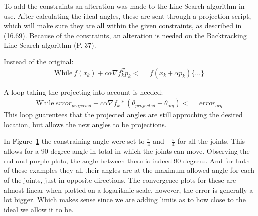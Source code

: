 \documentclass[11pt]{article} %
\begin{document}
To add the constraints an alteration was made to the Line Search algorithm in use. After calculating the ideal angles, these are sent through a projection script, which will make sure they are all within the given constraints, as described in (16.69).  Because of the constraints, an alteration is needed on the Backtracking Line Search algorithm (P. 37).

Instead of the original:
\begin{gather*}
\text{While} ~ f(x_k) + c \alpha \nabla f_k^T p_k <=f(x_k + \alpha p_k) \{ \dots \}
\end{gather*}

A loop taking the projecting into account is needed:
\begin{gather*}
\text{While} ~ error_{projected} + c \alpha \nabla f_k * (\theta_{projected} -\theta_{org}) <= error_{org}
\end{gather*}
This loop guarentees that the projected angles are still approching the desired location, but allows the new angles to be projections.

\begin{figure}[h!]
    \hfill
\caption{}
\label{fig:IK2}
\end{figure}
In Figure~\ref{fig:IK2} the constraining angle were set to $\frac{\pi}{4}$ and $-\frac{\pi}{4}$ for all the joints. This allows for a 90 degree angle in total in which the joints can move. Observing the red and purple plots, the angle between these is indeed 90 degrees. And for both of these examples they all their angles are at the maximum allowed angle for each of the joints, just in opposite directions. The convergence plots for these are almost linear when plotted on a logaritmic scale, however, the error is generally a lot bigger. Which makes sense since we are adding limits as to how close to the ideal we allow it to be.
\end{document}
